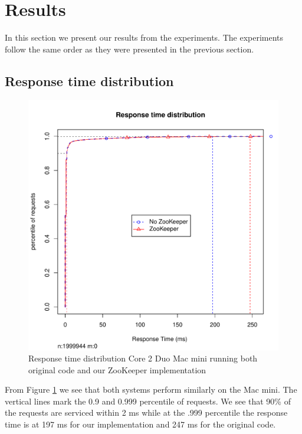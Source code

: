 \section{Results}
In this section we present our results from the experiments. The experiments follow the same order as they were presented in the previous section.


\subsection{Response time distribution}

\clearpage

\begin{figure}[h]
    \centering
    \includegraphics[width=1.0\textwidth]{results/distribution/distribution_macmini}
    \caption{Response time distribution Core 2 Duo Mac mini running both original code and our ZooKeeper implementation}
    \label{fig:dist_mini}
\end{figure}

From Figure \ref{fig:dist_mini} we see that both systems perform similarly on the Mac mini. The vertical lines mark the 0.9 and 0.999 percentile of requests. We see that 90\% of the requests are serviced within 2 ms while at the .999 percentile the response time is at 197 ms for our implementation and 247 ms for the original code.  

